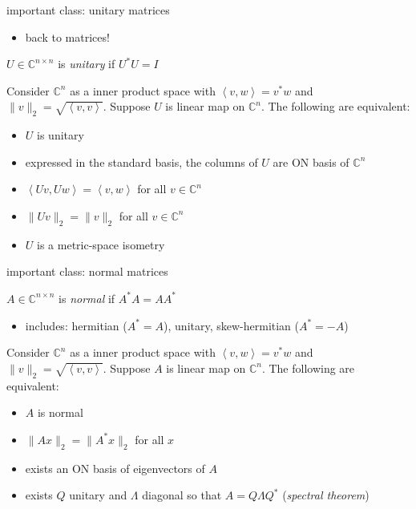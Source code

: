 \documentclass[10pt,hyperref]{beamer}
\newcommand{\CC}{\mathbb{C}}
\newcommand{\ip}[2]{\left<#1,#2\right>}
\begin{document}
\begin{frame}{important class: unitary matrices}

\begin{itemize}
\item back to matrices!
\end{itemize}

\begin{definition}
$U \in \CC^{n\times n}$ is \emph{unitary} if $U^*U=I$
\end{definition}

\begin{lemma}
Consider $\CC^n$ as a inner product space with $\ip{v}{w}=v^*w$ and $\|v\|_2 = \sqrt{\ip v v}$.  Suppose $U$ is linear map on $\CC^n$.  The following are equivalent:

\begin{itemize}
\item $U$ is unitary
\item expressed in the standard basis, the columns of $U$ are ON basis of $\CC^n$
\item $\ip{Uv}{Uw}=\ip{v}{w}$ for all $v\in\CC^n$
\item $\|Uv\|_2=\|v\|_2$ for all $v\in\CC^n$
\item $U$ is a metric-space isometry
\end{itemize}
\end{lemma}
\end{frame}


\begin{frame}{important class: normal matrices}

\begin{definition}
$A \in \CC^{n\times n}$ is \emph{normal} if $A^*A=AA^*$
\end{definition}

\begin{itemize}
\item includes: hermitian ($A^*=A$), unitary, skew-hermitian ($A^*=-A$)
\end{itemize}

\begin{lemma}
Consider $\CC^n$ as a inner product space with $\ip{v}{w}=v^*w$ and $\|v\|_2 = \sqrt{\ip v v}$.  Suppose $A$ is linear map on $\CC^n$.  The following are equivalent:

\begin{itemize}
\item $A$ is normal
\item $\|Ax\|_2 = \|A^*x\|_2$ for all $x$
\item exists an ON basis of eigenvectors of $A$
\item exists $Q$ unitary and $\Lambda$ diagonal so that $A=Q\Lambda Q^*$ (\emph{spectral theorem})
\end{itemize}
\end{lemma}
\end{frame}
\end{document}
